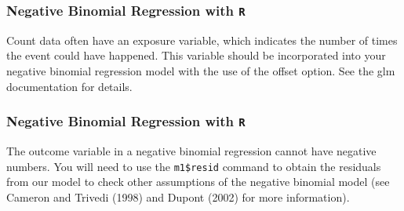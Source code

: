 \documentclass[00-GLMregslides.tex]{subfiles}
\begin{document}
\begin{frame}[fragile]
	\frametitle{Negative Binomial Regression with \texttt{R} }
	\Large
	Count data often have an exposure variable, which indicates the number of times the event could have happened. This variable should be incorporated into your negative binomial regression model with the use of the offset option. See the glm documentation for details.
\end{frame}
\begin{frame}[fragile]
	\frametitle{Negative Binomial Regression with \texttt{R} }
	\Large
	The outcome variable in a negative binomial regression cannot have negative numbers.
	You will need to use the \texttt{m1\$resid} command to obtain the residuals from our model to check other assumptions of the negative binomial model (see Cameron and Trivedi (1998) and Dupont (2002) for more information).
\end{frame}


\end{document}
